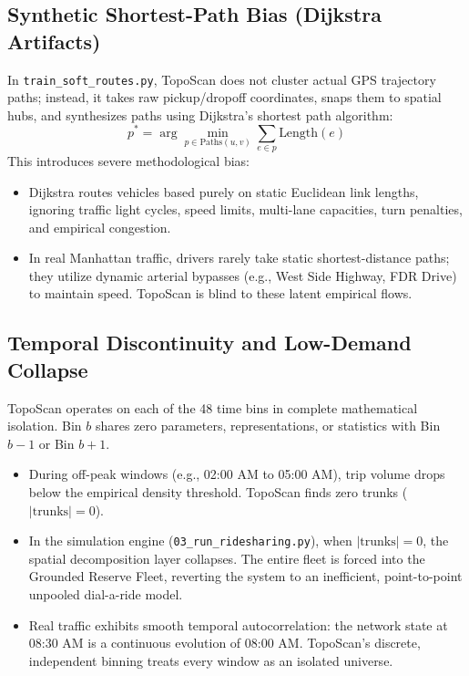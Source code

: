 \documentclass[12pt,a4paper]{article}
\begin{document}
\subsection{Synthetic Shortest-Path Bias (Dijkstra Artifacts)}
In \texttt{train\_soft\_routes.py}, TopoScan does not cluster actual GPS trajectory paths; instead, it takes raw pickup/dropoff coordinates, snaps them to spatial hubs, and synthesizes paths using Dijkstra's shortest path algorithm:
\begin{equation}
p^* = \arg\min_{p \in \text{Paths}(u, v)} \sum_{e \in p} \text{Length}(e)
\end{equation}
This introduces severe methodological bias:
\begin{itemize}
    \item Dijkstra routes vehicles based purely on static Euclidean link lengths, ignoring traffic light cycles, speed limits, multi-lane capacities, turn penalties, and empirical congestion.
    \item In real Manhattan traffic, drivers rarely take static shortest-distance paths; they utilize dynamic arterial bypasses (e.g., West Side Highway, FDR Drive) to maintain speed. TopoScan is blind to these latent empirical flows.
\end{itemize}

\subsection{Temporal Discontinuity and Low-Demand Collapse}
TopoScan operates on each of the 48 time bins in complete mathematical isolation. Bin $b$ shares zero parameters, representations, or statistics with Bin $b-1$ or Bin $b+1$.
\begin{itemize}
    \item During off-peak windows (e.g., 02:00 AM to 05:00 AM), trip volume drops below the empirical density threshold. TopoScan finds zero trunks ($|\text{trunks}| = 0$).
    \item In the simulation engine (\texttt{03\_run\_ridesharing.py}), when $|\text{trunks}| = 0$, the spatial decomposition layer collapses. The entire fleet is forced into the Grounded Reserve Fleet, reverting the system to an inefficient, point-to-point unpooled dial-a-ride model.
    \item Real traffic exhibits smooth temporal autocorrelation: the network state at 08:30 AM is a continuous evolution of 08:00 AM. TopoScan's discrete, independent binning treats every window as an isolated universe.
\end{itemize}
\end{document}
